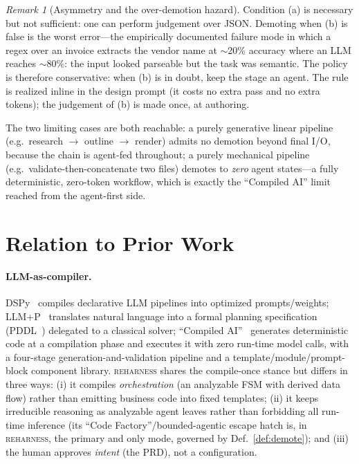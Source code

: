 \documentclass[11pt]{article}
\theoremstyle{plain}
\theoremstyle{definition}
\theoremstyle{remark}
\newtheorem{remark}[theorem]{Remark}
\newcommand{\reharness}{\textsc{reharness}}
\newcommand{\state}[1]{\textsf{#1}}
\begin{document}
\begin{remark}[Asymmetry and the over-demotion hazard]
Condition (a) is necessary but not sufficient: one can perform judgement over JSON.
Demoting when (b) is false is the worst error---the empirically documented failure
mode in which a regex over an invoice extracts the vendor name at $\sim$20\% accuracy
where an LLM reaches $\sim$80\%: the input looked parseable but the task was
semantic. The policy is therefore conservative: when (b) is in doubt, keep the stage
an \state{agent}. The rule is realized inline in the \state{design} prompt (it costs
no extra pass and no extra tokens); the judgement of (b) is made once, at authoring.
\end{remark}

The two limiting cases are both reachable: a purely generative linear pipeline
(e.g.\ research $\to$ outline $\to$ render) admits no demotion beyond final I/O,
because the chain is agent-fed throughout; a purely mechanical pipeline (e.g.\
validate-then-concatenate two files) demotes to \emph{zero} agent states---a fully
deterministic, zero-token workflow, which is exactly the ``Compiled AI'' limit
reached from the agent-first side.

\section{Relation to Prior Work}

\paragraph{LLM-as-compiler.} DSPy~\cite{dspy} compiles declarative LLM pipelines
into optimized prompts/weights; LLM+P~\cite{llmp} translates natural language into a
formal planning specification (PDDL~\cite{pddl}) delegated to a classical solver;
``Compiled AI''~\cite{compiledai} generates deterministic code at a compilation phase and executes it with
zero run-time model calls, with a four-stage generation-and-validation pipeline and
a template/module/prompt-block component library. \reharness{} shares the
compile-once stance but differs in three ways: (i) it compiles \emph{orchestration}
(an analyzable FSM with derived data flow) rather than emitting business code into
fixed templates; (ii) it keeps irreducible reasoning as analyzable agent leaves
rather than forbidding all run-time inference (its ``Code Factory''/bounded-agentic
escape hatch is, in \reharness{}, the primary and only mode, governed by
Def.~\ref{def:demote}); and (iii) the human approves \emph{intent} (the PRD), not a
configuration.
\end{document}
